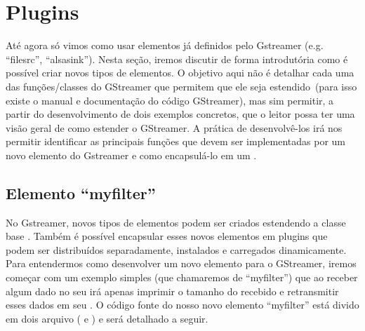 \section{Plugins}
\label{sec:plugins}


Até agora só vimos como usar elementos já definidos pelo Gstreamer (e.g.
``filesrc'', ``alsasink'').  Nesta seção, iremos discutir de forma introdutória
como é possível criar novos tipos de elementos.  O objetivo aqui não é
detalhar cada uma das funções/classes do GStreamer que permitem que ele seja
estendido~(para isso existe o manual e documentação do código GStreamer), mas
sim permitir, a partir do desenvolvimento de dois exemplos concretos, que o
leitor possa ter uma visão geral de como estender o GStreamer.
A prática de desenvolvê-los irá nos permitir identificar as principais funções
que devem ser implementadas por um novo elemento do Gstreamer e como
encapsulá-lo em um .
 
\subsection*{Elemento ``myfilter''}
No Gstreamer, novos tipos de elementos podem ser criados estendendo a classe
base .  Também é possível encapsular esses novos elementos em
plugins que podem ser distribuídos separadamente, instalados e carregados
dinamicamente.  Para entendermos como desenvolver um novo elemento para o
GStreamer, iremos começar com um exemplo simples (que chamaremos de
``myfilter'') que ao receber algum dado no seu  irá apenas
imprimir o tamanho do  recebido e retransmitir esses dados em seu
.  O código fonte do nosso novo elemento ``myfilter'' está
divido em dois arquivo ( e ) e será detalhado a
seguir.

